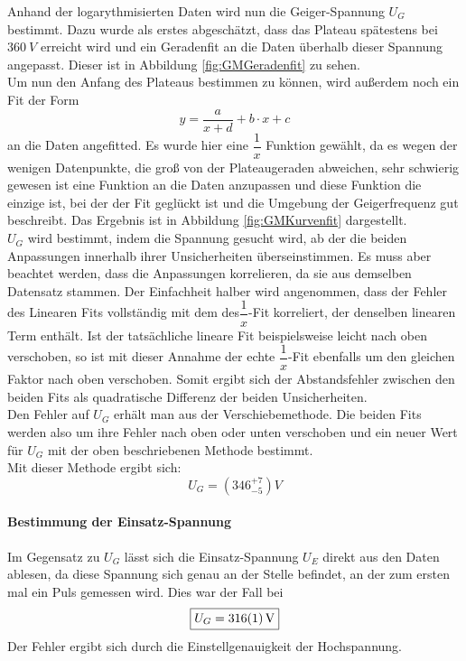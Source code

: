 \documentclass[12pt,a4paper]{article}
\begin{document}
Anhand der logarythmisierten Daten wird nun die Geiger-Spannung $U_G$ bestimmt. Dazu  wurde als erstes abgeschätzt, dass das Plateau spätestens bei $\SI{360}{V}$ erreicht wird und ein Geradenfit an die Daten überhalb dieser Spannung angepasst. Dieser ist in Abbildung \ref{fig:GMGeradenfit} zu sehen.\\
Um nun den Anfang des Plateaus bestimmen zu können, wird außerdem noch ein Fit der Form
\begin{equation*}
y = \dfrac{a}{x+d} + b\cdot x + c
\end{equation*}
an die Daten angefitted. Es wurde hier eine $\dfrac{1}{x}$ Funktion gewählt, da es wegen der wenigen Datenpunkte, die groß von der Plateaugeraden abweichen, sehr schwierig gewesen ist eine Funktion an die Daten anzupassen und diese Funktion die einzige ist, bei der der Fit geglückt ist und die Umgebung der Geigerfrequenz gut beschreibt. Das Ergebnis ist in Abbildung \ref{fig:GMKurvenfit} dargestellt.\\
$U_G$ wird bestimmt, indem die Spannung gesucht wird, ab der die beiden Anpassungen innerhalb ihrer Unsicherheiten überseinstimmen. Es muss aber beachtet werden, dass die Anpassungen korrelieren, da sie aus demselben Datensatz stammen. Der Einfachheit halber wird angenommen, dass der Fehler des Linearen Fits vollständig mit dem des$\dfrac{1}{x}$-Fit korreliert, der denselben linearen Term enthält. Ist der tatsächliche lineare Fit beispielsweise leicht nach oben verschoben, so ist mit dieser Annahme der echte $\dfrac{1}{x}$-Fit ebenfalls um den gleichen Faktor nach oben verschoben. Somit ergibt sich der Abstandsfehler zwischen den beiden Fits als quadratische Differenz der beiden Unsicherheiten.\\
Den Fehler auf $U_G$ erhält man aus der Verschiebemethode. Die beiden Fits werden also um ihre Fehler nach oben oder unten verschoben und ein neuer Wert für $U_G$ mit der oben beschriebenen Methode bestimmt.\\
Mit dieser Methode ergibt sich:
\begin{equation*}
\boxed{U_G = (346_{-5}^{+7})\si{V}}
\end{equation*}
\paragraph{Bestimmung der Einsatz-Spannung}
Im Gegensatz zu $U_G$ lässt sich die Einsatz-Spannung $U_E$ direkt aus den Daten ablesen, da diese Spannung sich genau an der Stelle befindet, an der zum ersten mal ein Puls gemessen wird. Dies war der Fall bei
\begin{equation*}
\boxed{U_G = \SI{316\pm 1}{V}}
\end{equation*}
Der Fehler ergibt sich durch die Einstellgenauigkeit der Hochspannung.
\end{document}

